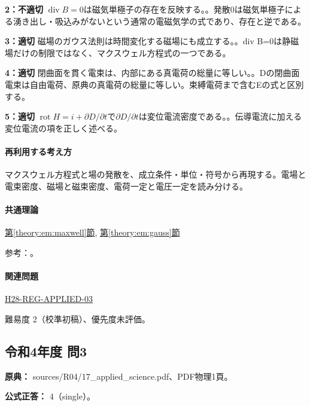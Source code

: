 \noindent\textbf{2：不適切} \(\operatorname{div}B=0\)は磁気単極子の存在を反映する。。発散0は磁気単極子による湧き出し・吸込みがないという通常の電磁気学の式であり、存在と逆である。\par

\noindent\textbf{3：適切} 磁場のガウス法則は時間変化する磁場にも成立する。。div B=\allowbreak{}0は静磁場だけの制限ではなく、マクスウェル方程式の一つである。\par

\noindent\textbf{4：適切} 閉曲面を貫く電束は、内部にある真電荷の総量に等しい。。Dの閉曲面電束は自由電荷、原典の真電荷の総量に等しい。束縛電荷まで含むEの式と区別する。\par

\noindent\textbf{5：適切} \(\operatorname{rot}H=i+\partial D/\partial t\)で\(\partial D/\partial t\)は変位電流密度である。。伝導電流に加える変位電流の項を正しく述べる。\par

\paragraph{再利用する考え方} マクスウェル方程式と場の発散を、成立条件・単位・符号から再現する。電場と電束密度、磁場と磁束密度、電荷一定と電圧一定を読み分ける。

\paragraph{共通理論} \hyperref[theory:em:maxwell]{第\ref*{theory:em:maxwell}節}, \hyperref[theory:em:gauss]{第\ref*{theory:em:gauss}節}

\par 参考：\cite{mit_em13}。

\paragraph{関連問題} \hyperref[q:h28-reg-applied-03]{H28-REG-APPLIED-03}

\par 難易度 2（校準初稿）、優先度未評価。

\subsection{令和4年度 問3}
\label{q:r04-reg-applied-03}

\noindent\textbf{原典：} sources/R04/17\_applied\_science.pdf、PDF物理1頁。

\textbf{公式正答：} 4（single）。

